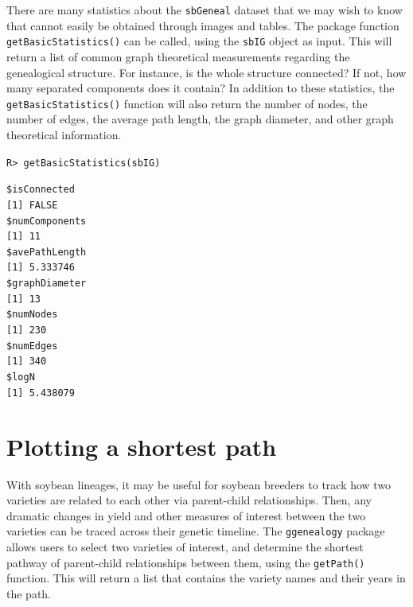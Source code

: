 \documentclass[11pt,a4paper,oldfontcommands,openany]{memoir}
\DeclareRobustCommand{\mybox}[2][gray!15]{%
\begin{tcolorbox}[   %
        breakable,
        left=0pt,
        right=0pt,
        top=0pt,
        bottom=0pt,
        colback=#1,
        colframe=#1,
        width=\dimexpr\textwidth\relax, 
        enlarge left by=0mm,
        boxsep=5pt,
        arc=0pt,outer arc=0pt,
        ]
        #2
\end{tcolorbox}
}
\numberwithin{equation}{section} %
\newcommand{\code}[1]{{\texttt{#1}}}
\newcommand{\pkg}[1]{{\texttt{#1}}}
\begin{document}
There are many statistics about the \code{sbGeneal} dataset that we may wish to know that cannot easily be obtained through images and tables. The package function \code{getBasicStatistics()} can be called, using the \code{sbIG} object as input. This will return a list of common graph theoretical measurements regarding the genealogical structure. For instance, is the whole structure connected? If not, how many separated components does it contain? In addition to these statistics, the \code{getBasicStatistics()} function will also return the number of nodes, the number of edges, the average path length, the graph diameter, and other graph theoretical information.

\mybox{
\texttt{R> getBasicStatistics(sbIG)}
}

\mybox[green!10]{
\texttt{\$isConnected}\\
\texttt{[1] FALSE}\\

\texttt{\$numComponents}\\
\texttt{[1] 11}\\

\texttt{\$avePathLength}\\
\texttt{[1] 5.333746}\\

\texttt{\$graphDiameter}\\
\texttt{[1] 13}\\

\texttt{\$numNodes}\\
\texttt{[1] 230}\\

\texttt{\$numEdges}\\
\texttt{[1] 340}\\

\texttt{\$logN}\\
\texttt{[1] 5.438079}
}

\section{Plotting a shortest path}

With soybean lineages, it may be useful for soybean breeders to track how two varieties are related to each other via parent-child relationships. Then, any dramatic changes in yield and other measures of interest between the two varieties can be traced across their genetic timeline. The \pkg{ggenealogy} package allows users to select two varieties of interest, and determine the shortest pathway of parent-child relationships between them, using the \code{getPath()} function. This will return a list that contains the variety names and their years in the path.
\end{document}
